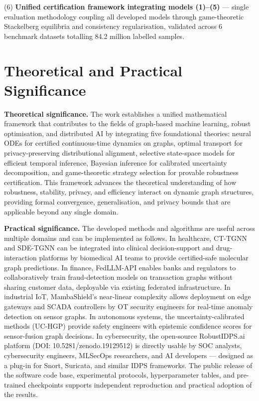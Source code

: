 (6) \textbf{Unified certification framework integrating models (1)--(5)} --- single evaluation methodology coupling all developed models through game-theoretic Stackelberg equilibria and consistency regularisation, validated across 6 benchmark datasets totalling 84.2 million labelled samples.


\section*{Theoretical and Practical Significance}

\textbf{Theoretical significance.} The work establishes a unified mathematical framework that contributes to the fields of graph-based machine learning, robust optimisation, and distributed AI by integrating five foundational theories: neural ODEs for certified continuous-time dynamics on graphs, optimal transport for privacy-preserving distributional alignment, selective state-space models for efficient temporal inference, Bayesian inference for calibrated uncertainty decomposition, and game-theoretic strategy selection for provable robustness certification. This framework advances the theoretical understanding of how robustness, stability, privacy, and efficiency interact on dynamic graph structures, providing formal convergence, generalisation, and privacy bounds that are applicable beyond any single domain.

\textbf{Practical significance.} The developed methods and algorithms are useful across multiple domains and can be implemented as follows. In healthcare, CT-TGNN and SDE-TGNN can be integrated into clinical decision-support and drug-interaction platforms by biomedical AI teams to provide certified-safe molecular graph predictions. In finance, FedLLM-API enables banks and regulators to collaboratively train fraud-detection models on transaction graphs without sharing customer data, deployable via existing federated infrastructure. In industrial IoT, MambaShield's near-linear complexity allows deployment on edge gateways and SCADA controllers by OT security engineers for real-time anomaly detection on sensor graphs. In autonomous systems, the uncertainty-calibrated methods (UC-HGP) provide safety engineers with epistemic confidence scores for sensor-fusion graph decisions. In cybersecurity, the open-source RobustIDPS.ai platform (DOI: 10.5281/zenodo.19129512) is directly usable by SOC analysts, cybersecurity engineers, MLSecOps researchers, and AI developers --- designed as a plug-in for Snort, Suricata, and similar IDPS frameworks. The public release of the software code base, experimental protocols, hyperparameter tables, and pre-trained checkpoints supports independent reproduction and practical adoption of the results.


